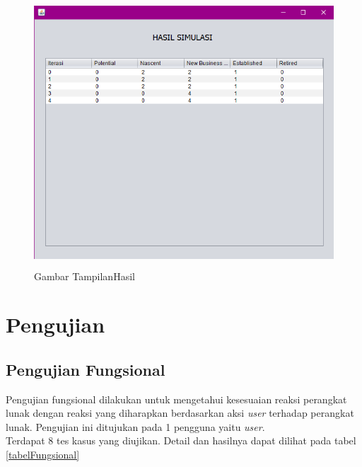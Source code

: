 \begin{enumerate}
	\begin{figure} [H]
	\centering  
	\includegraphics[width=12cm, height=10cm]{hasil2} 
		\caption[Gambar TampilanHasil]{Gambar TampilanHasil}
	\label{fig:tampilanHasil} 
\end{figure}

\end{enumerate}

\section{Pengujian}
\subsection{Pengujian Fungsional}
Pengujian fungsional dilakukan untuk mengetahui kesesuaian reaksi perangkat lunak dengan reaksi yang diharapkan berdasarkan aksi \textit{user} terhadap perangkat lunak. Pengujian ini ditujukan pada 1 pengguna yaitu \textit{user}.\\
Terdapat 8 tes kasus yang diujikan. Detail dan hasilnya dapat dilihat pada tabel \ref{tabelFungsional}

